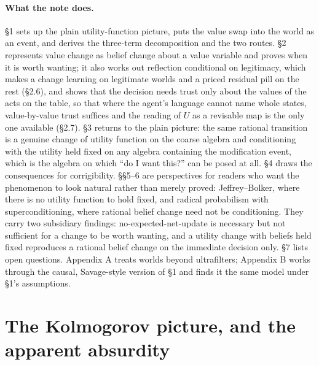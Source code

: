 \documentclass[11pt,a4paper]{article}
\begin{document}
\paragraph{What the note does.}
\S1 sets up the plain utility-function picture, puts the value swap into the world as an event, and derives the three-term decomposition and the two routes. \S2 represents value change as belief change about a value variable and proves when it is worth wanting; it also works out reflection conditional on legitimacy, which makes a change learning on legitimate worlds and a priced residual pill on the rest (\S2.6), and shows that the decision needs trust only about the values of the acts on the table, so that where the agent's language cannot name whole states, value-by-value trust suffices and the reading of $U$ as a revisable map is the only one available (\S2.7). \S3 returns to the plain picture: the same rational transition is a genuine change of utility function on the coarse algebra and conditioning with the utility held fixed on any algebra containing the modification event, which is the algebra on which ``do I want this?'' can be posed at all. \S4 draws the consequences for corrigibility. \S\S5--6 are perspectives for readers who want the phenomenon to look natural rather than merely proved: Jeffrey--Bolker, where there is no utility function to hold fixed, and radical probabilism with superconditioning, where rational belief change need not be conditioning. They carry two subsidiary findings: no-expected-net-update is necessary but not sufficient for a change to be worth wanting, and a utility change with beliefs held fixed reproduces a rational belief change on the immediate decision only. \S7 lists open questions. Appendix A treats worlds beyond ultrafilters; Appendix B works through the causal, Savage-style version of \S1 and finds it the same model under \S1's assumptions.

\section{The Kolmogorov picture, and the apparent absurdity}
\end{document}
